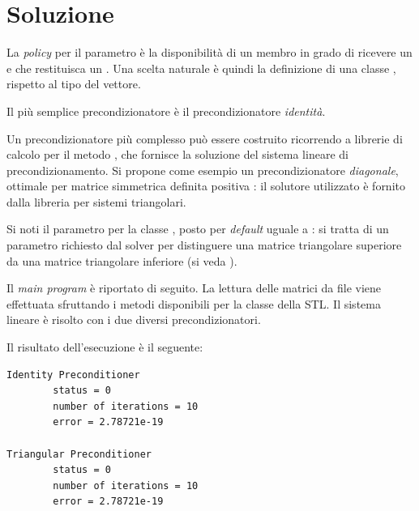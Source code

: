 \newpage

\section*{Soluzione}

La \emph{policy} per il parametro  
\`e la disponibilit\`a di un membro  in grado di ricevere
un  e che restituisca un . Una scelta naturale
\`e quindi la definizione di una classe ,
 rispetto al tipo del vettore.

Il pi\`u semplice precondizionatore \`e il precondizionatore
\emph{identit\`a}.

\lstset{basicstyle=\scriptsize\sf}

\lstset{basicstyle=\sf}

Un precondizionatore pi\`u complesso pu\`o essere costruito ricorrendo
a librerie di calcolo per il metodo , che fornisce la
soluzione del sistema lineare di precondizionamento. Si propone come
esempio un precondizionatore \emph{diagonale}, ottimale per matrice
simmetrica definita positiva \cite{Quarteroni.Sacco.ea:2000}: il solutore utilizzato \`e fornito dalla
libreria  per sistemi triangolari.

\lstset{basicstyle=\scriptsize\sf}

\lstset{basicstyle=\sf}

Si noti il parametro   per la classe
, posto per \emph{default} uguale a
: si tratta di un parametro richiesto dal solver
 per distinguere una matrice triangolare superiore
da una matrice triangolare inferiore (si veda \cite{UBLASweb}).

Il \emph{main program} \`e riportato di seguito. La lettura delle
matrici da file viene effettuata sfruttando i metodi disponibili per
la classe  della STL. Il sistema lineare \`e risolto con i
due diversi precondizionatori.

\lstset{basicstyle=\scriptsize\sf}

\lstset{basicstyle=\sf}

Il risultato dell'esecuzione \`e il seguente:
\begin{verbatim}
Identity Preconditioner
        status = 0
        number of iterations = 10
        error = 2.78721e-19

Triangular Preconditioner
        status = 0
        number of iterations = 10
        error = 2.78721e-19
\end{verbatim}

